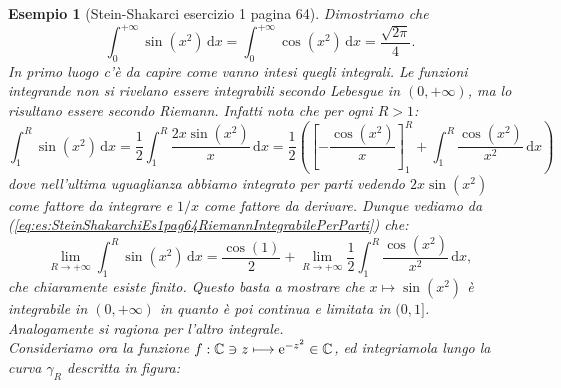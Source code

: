 \documentclass[11pt]{book}
\theoremstyle{Definizione}
\theoremstyle{TeoremaProposizioneLemmaCorollarioCongettura}
\theoremstyle{OsservazioneNotaEsempio}
\newtheorem{myes}{Esempio}[section]
\newcommand{\R}{\mathbb{R}}
\newcommand{\C}{\mathbb{C}}
\renewcommand{\i}{\textup{i}}
\newcommand{\e}{\textup{e}}
\renewcommand{\d}{\mathrm{d}}
\newcommand{\dx}{\,\d x}
\newcommand{\frecciaIn}{
\tikz \draw[-latex] (-1pt,0) -- (1pt,0);
}
\newcommand{\frecciaOut}{
\tikz \draw[latex-] (-1pt,0) -- (1pt,0);
}
\begin{document}
\begin{myes}[Stein-Shakarci esercizio 1 pagina 64]\label{es:SteinShakarchiEs1pag64}
Dimostriamo che
$$
\int_0^{+\infty} \sin(x^2) \dx = \int_0^{+\infty} \cos(x^2)\dx = \frac{\sqrt{2\pi}}{4}.
$$
In primo luogo c'è da capire come vanno intesi quegli integrali. Le funzioni integrande non si rivelano essere integrabili secondo Lebesgue in $(0,+\infty)$, ma lo risultano essere secondo Riemann. Infatti nota che per ogni $R > 1$:
\begin{equation}\label{eq:es:SteinShakarchiEs1pag64RiemannIntegrabilePerParti}
\int_{1}^{R} \sin(x^2)\dx = \frac{1}{2}\int_1^{R} \frac{2x\sin(x^2)}{x}\dx = \frac{1}{2}\left(\left[-\frac{\cos(x^2)}{x}\right]_1^{R}+\int_1^{R} \frac{\cos(x^2)}{x^2}\dx\right)
\end{equation}
dove nell'ultima uguaglianza abbiamo integrato per parti vedendo $2x\sin(x^2)$ come fattore da integrare e $1/x$ come fattore da derivare. Dunque vediamo da (\ref{eq:es:SteinShakarchiEs1pag64RiemannIntegrabilePerParti}) che:
$$
\lim_{R \to +\infty} \int_1^{R} \sin(x^2)\dx = \frac{\cos(1)}{2} + \lim_{R \to +\infty} \frac{1}{2}\int_1^{R} \frac{\cos(x^2)}{x^2}\dx,
$$
che chiaramente esiste finito. Questo basta a mostrare che $x \mapsto \sin(x^2)$ è integrabile in $(0,+\infty)$ in quanto è poi continua e limitata in $(0,1]$. Analogamente si ragiona per l'altro integrale.\\
Consideriamo ora la funzione $f:\C \ni z \longmapsto \e^{-z^2}\in \C$, ed integriamola lungo la curva $\gamma_R$ descritta in figura:
\begin{center}
\end{center}
\end{myes}
\end{document}
